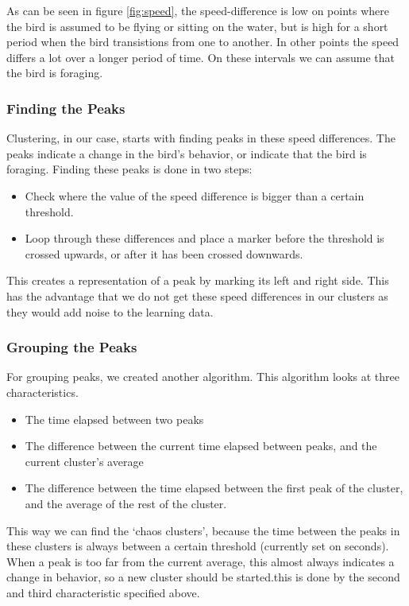 
As can be seen in figure \ref{fig:speed}, the speed-difference is low on points where the bird is assumed
to be flying or sitting on the water, but is high for a short period when the bird transistions from one to another. In other points the speed differs a lot over a longer period of time. On these intervals we can assume that the bird is foraging.


\subsubsection{Finding the Peaks}
 Clustering, in our case, starts with finding peaks in these speed differences.
 The peaks indicate a change in the bird's behavior, or indicate that the bird
 is foraging. Finding these peaks is done in two steps:

 \begin{itemize}
    \item Check where the value of the speed difference is bigger than a certain
    threshold.
    \item Loop through these differences and place a marker before the threshold
    is crossed upwards, or after it has been crossed downwards. 
 \end{itemize}
 
 This creates a representation of a peak by marking its left and right side.
 This has the advantage that we do not get these speed differences in our
 clusters as they would add noise to the learning data.

 \subsubsection{Grouping the Peaks}
 For grouping peaks, we created another algorithm. This algorithm looks at three
 characteristics.  
 \begin{itemize}
 \item The time elapsed between two peaks
 \item The difference between the current time elapsed between peaks, and the
 current cluster's average
 \item The difference between the time elapsed between the first peak of the
 cluster, and the average of the rest of the cluster.
 \end{itemize}
 This way we can find the `chaos clusters', because the time between the peaks
 in these clusters is always between a certain threshold (currently set on
 \timeThreshold seconds). 
 When a peak is too far from the  current average, this almost always indicates
 a change in behavior, so a new cluster should be started.this is done by the
 second and third characteristic specified above.

